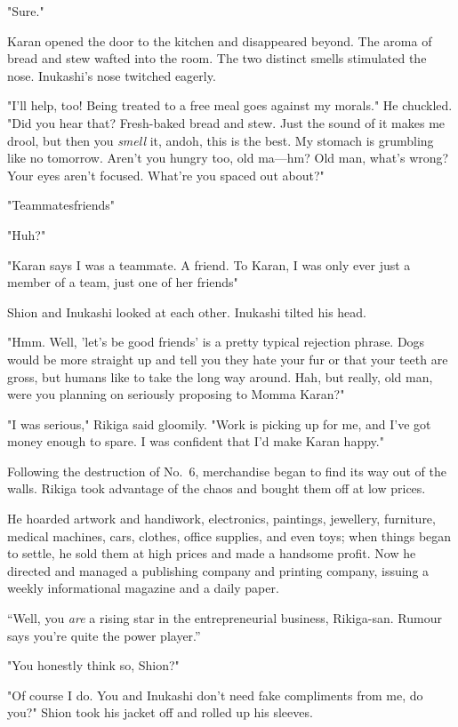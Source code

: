 "Sure."

Karan opened the door to the kitchen and disappeared beyond. The aroma
of bread and stew wafted into the room. The two distinct smells
stimulated the nose. Inukashi's nose twitched eagerly.

"I'll help, too! Being treated to a free meal goes against my morals."
He chuckled. "Did you hear that? Fresh-baked bread and stew. Just the
sound of it makes me drool, but then you \emph{smell} it, and\el oh, this is
the best. My stomach is grumbling like no tomorrow. Aren't you hungry
too, old ma---hm? Old man, what's wrong? Your eyes aren't focused. What're
you spaced out about?"

"\el Teammates\el friends\el "

"Huh?"

"Karan says I was a teammate. A friend. To Karan, I was only ever just a
member of a team, just one of her friends\el "

Shion and Inukashi looked at each other. Inukashi tilted his head.

"Hmm. Well, 'let's be good friends' is a pretty typical rejection
phrase. Dogs would be more straight up and tell you they hate your fur
or that your teeth are gross, but humans like to take the long way
around. Hah, but really, old man, were you planning on seriously
proposing to Momma Karan?"

"\el I was serious," Rikiga said gloomily. "Work is picking up for me,
and I've got money enough to spare. I was confident that I'd make Karan
happy."

Following the destruction of No.~6, merchandise began to find its way
out of the walls. Rikiga took advantage of the chaos and bought them off
at low prices.

He hoarded artwork and handiwork, electronics, paintings, jewellery,
furniture, medical machines, cars, clothes, office supplies, and even
toys; when things began to settle, he sold them at high prices and made
a handsome profit. Now he directed and managed a publishing company and
printing company, issuing a weekly informational magazine and a daily
paper.

``Well, you \emph{are} a rising star in the entrepreneurial business,
Rikiga-san. Rumour says you're quite the power player.''

"You honestly think so, Shion?"

"Of course I do. You and Inukashi don't need fake compliments from me,
do you?" Shion took his jacket off and rolled up his sleeves.

